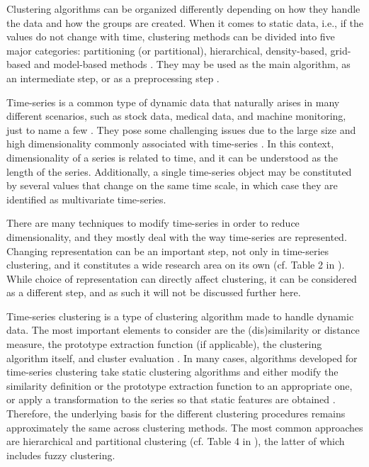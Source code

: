 Clustering algorithms can be organized differently depending on how they handle the data and how the groups are created.
When it comes to static data, i.e., if the values do not change with time,
clustering methods can be divided into five major categories:
partitioning (or partitional),
hierarchical,
density-based,
grid-based and
model-based methods \citep{liao2005, rani2012}.
They may be used as the main algorithm,
as an intermediate step,
or as a preprocessing step \citep{aghabozorgi2015}.

Time-series is a common type of dynamic data that naturally arises in many different scenarios,
such as stock data,
medical data,
and machine monitoring,
just to name a few \citep{aghabozorgi2015, aggarwal2013}.
They pose some challenging issues due to the large size and high dimensionality commonly associated with time-series \citep{aghabozorgi2015}.
In this context,
dimensionality of a series is related to time,
and it can be understood as the length of the series.
Additionally, a single time-series object may be constituted by several values that change on the same time scale,
in which case they are identified as multivariate time-series.

There are many techniques to modify time-series in order to reduce dimensionality,
and they mostly deal with the way time-series are represented.
Changing representation can be an important step,
not only in time-series clustering,
and it constitutes a wide research area on its own (cf. Table 2 in \citet{aghabozorgi2015}).
While choice of representation can directly affect clustering,
it can be considered as a different step,
and as such it will not be discussed further here.

Time-series clustering is a type of clustering algorithm made to handle dynamic data.
The most important elements to consider are the (dis)similarity or distance measure,
the prototype extraction function (if applicable),
the clustering algorithm itself,
and cluster evaluation \citep{aghabozorgi2015}.
In many cases,
algorithms developed for time-series clustering take static clustering algorithms and either modify the similarity definition or the prototype extraction function to an appropriate one,
or apply a transformation to the series so that static features are obtained \citep{liao2005}.
Therefore, the underlying basis for the different clustering procedures remains approximately the same across clustering methods.
The most common approaches are hierarchical and partitional clustering (cf. Table 4 in \citet{aghabozorgi2015}),
the latter of which includes fuzzy clustering.

